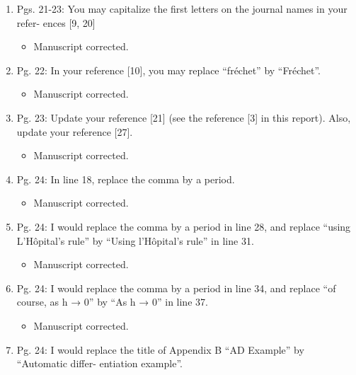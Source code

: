 \documentclass{article}
\begin{document}
\begin{enumerate}
 \item Pgs. 21-23: You may capitalize the ﬁrst letters on the journal names in your refer-
ences [9, 20]

{\color{red}  
\begin{itemize}
     \item
 Manuscript corrected.
  \end{itemize}}

 \item Pg. 22: In your reference [10], you may replace “fr{\'e}chet” by “Fr{\'e}chet”.

{\color{red}  
\begin{itemize}
     \item
 Manuscript corrected.
  \end{itemize}}

 \item Pg. 23: Update your reference [21] (see the reference [3] in this report). Also,
update your reference [27].

{\color{red}  
\begin{itemize}
     \item
 Manuscript corrected.
  \end{itemize}}

 \item Pg. 24: In line 18, replace the comma by a period.

{\color{red}  
\begin{itemize}
     \item
 Manuscript corrected.
  \end{itemize}}

 \item Pg. 24: I would replace the comma by a period in line 28, and replace “using
     L’H\^opital’s rule” by “Using l’H\^opital’s rule” in line 31.

{\color{red}  
\begin{itemize}
     \item
 Manuscript corrected.
  \end{itemize}}

 \item Pg. 24: I would replace the comma by a period in line 34, and replace “of course,
as h → 0” by “As h → 0” in line 37.

{\color{red}  
\begin{itemize}
     \item
 Manuscript corrected.
  \end{itemize}}

 \item Pg. 24: I would replace the title of Appendix B “AD Example” by “Automatic differ-
entiation example”.


\end{enumerate}
\end{document}
